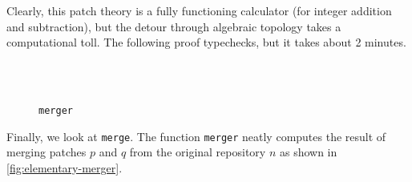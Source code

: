 Clearly, this patch theory is a fully functioning calculator (for integer addition and subtraction),
but the detour through algebraic topology takes a computational toll.
The following proof typechecks, but it takes about 2 minutes.
\begin{code}%
%
\>[2]\<%
\\
%
\>[2]\<%
\\
%
\>[2]\<%
\end{code}

\begin{figure}
\begin{centering}
\caption{\texttt{merger}}
\label{fig:elementary-merger}
\end{centering}
\end{figure}

Finally, we look at \texttt{merge}. The function \texttt{merger} neatly computes the result of
merging patches $p$ and $q$ from the original repository $n$ as shown in
\autoref{fig:elementary-merger}.
\begin{code}%
%
\>[2]\AgdaSpace{}%
\AgdaSymbol{:}\AgdaSpace{}%
\AgdaSpace{}%
\AgdaSpace{}%
\AgdaSpace{}%
\AgdaSpace{}%
\AgdaSpace{}%
\AgdaSpace{}%
\AgdaSpace{}%
\AgdaSpace{}%
\<%
\\
%
\>[2]\AgdaSpace{}%
\AgdaSpace{}%
\AgdaSpace{}%
\AgdaSpace{}%
\AgdaSymbol{=}\AgdaSpace{}%
%
\>[135I]\AgdaSpace{}%
\AgdaSymbol{=}\AgdaSpace{}%
\AgdaSpace{}%
\AgdaSpace{}%
\<%
\\
\>[.][@{}l@{}]\<[135I]%
\>[21]\AgdaSpace{}%
\AgdaSymbol{=}\AgdaSpace{}%
\AgdaSpace{}%
\AgdaSpace{}%
\<%
\\
%
\>[21]\AgdaSymbol{(}\AgdaSpace{}%
\AgdaOperator{\AgdaInductiveConstructor{,}}\AgdaSpace{}%
\AgdaSymbol{)}\AgdaSpace{}%
\AgdaSymbol{=}\AgdaSpace{}%
\AgdaSpace{}%
\AgdaSymbol{(}\AgdaSpace{}%
\AgdaOperator{\AgdaInductiveConstructor{,}}\AgdaSpace{}%
\AgdaSymbol{)}\<%
\\
\>[2][@{}l@{\AgdaIndent{0}}]%
\>[4]\AgdaSpace{}%
\AgdaSymbol{(}\AgdaSpace{}%
\AgdaSpace{}%
\AgdaSpace{}%
\AgdaOperator{\AgdaInductiveConstructor{,}}\AgdaSpace{}%
\AgdaSpace{}%
\AgdaSpace{}%
\AgdaSymbol{)}\<%
\end{code}

